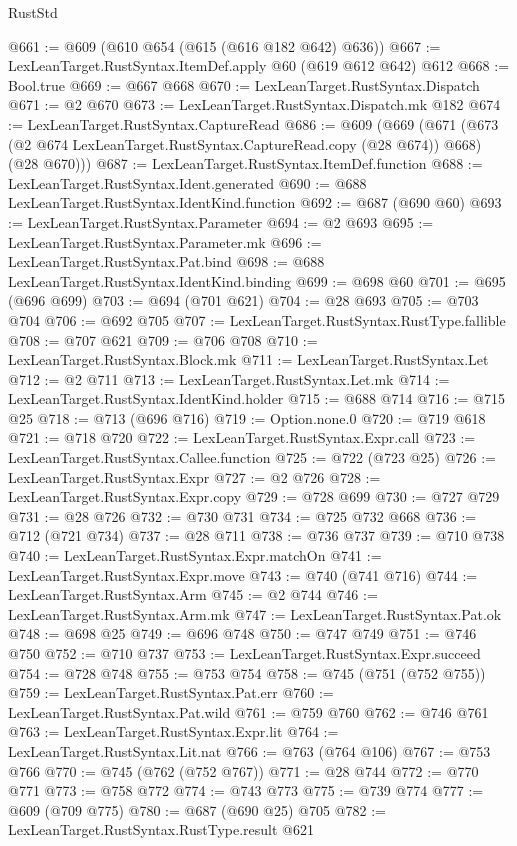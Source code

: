 \begin{lexlean}{RustStd}
\begin{coremodule}
@661 := @609 (@610 @654 (@615 (@616 @182 @642) @636))
@667 := LexLeanTarget.RustSyntax.ItemDef.apply @60 (@619 @612 @642) @612
@668 := Bool.true
@669 := @667 @668
@670 := LexLeanTarget.RustSyntax.Dispatch
@671 := @2 @670
@673 := LexLeanTarget.RustSyntax.Dispatch.mk @182
@674 := LexLeanTarget.RustSyntax.CaptureRead
@686 := @609
    (@669
      (@671 (@673 (@2 @674 LexLeanTarget.RustSyntax.CaptureRead.copy (@28 @674)) @668) (@28 @670)))
@687 := LexLeanTarget.RustSyntax.ItemDef.function
@688 := LexLeanTarget.RustSyntax.Ident.generated
@690 := @688 LexLeanTarget.RustSyntax.IdentKind.function
@692 := @687 (@690 @60)
@693 := LexLeanTarget.RustSyntax.Parameter
@694 := @2 @693
@695 := LexLeanTarget.RustSyntax.Parameter.mk
@696 := LexLeanTarget.RustSyntax.Pat.bind
@698 := @688 LexLeanTarget.RustSyntax.IdentKind.binding
@699 := @698 @60
@701 := @695 (@696 @699)
@703 := @694 (@701 @621)
@704 := @28 @693
@705 := @703 @704
@706 := @692 @705
@707 := LexLeanTarget.RustSyntax.RustType.fallible
@708 := @707 @621
@709 := @706 @708
@710 := LexLeanTarget.RustSyntax.Block.mk
@711 := LexLeanTarget.RustSyntax.Let
@712 := @2 @711
@713 := LexLeanTarget.RustSyntax.Let.mk
@714 := LexLeanTarget.RustSyntax.IdentKind.holder
@715 := @688 @714
@716 := @715 @25
@718 := @713 (@696 @716)
@719 := Option.none.{0}
@720 := @719 @618
@721 := @718 @720
@722 := LexLeanTarget.RustSyntax.Expr.call
@723 := LexLeanTarget.RustSyntax.Callee.function
@725 := @722 (@723 @25)
@726 := LexLeanTarget.RustSyntax.Expr
@727 := @2 @726
@728 := LexLeanTarget.RustSyntax.Expr.copy
@729 := @728 @699
@730 := @727 @729
@731 := @28 @726
@732 := @730 @731
@734 := @725 @732 @668
@736 := @712 (@721 @734)
@737 := @28 @711
@738 := @736 @737
@739 := @710 @738
@740 := LexLeanTarget.RustSyntax.Expr.matchOn
@741 := LexLeanTarget.RustSyntax.Expr.move
@743 := @740 (@741 @716)
@744 := LexLeanTarget.RustSyntax.Arm
@745 := @2 @744
@746 := LexLeanTarget.RustSyntax.Arm.mk
@747 := LexLeanTarget.RustSyntax.Pat.ok
@748 := @698 @25
@749 := @696 @748
@750 := @747 @749
@751 := @746 @750
@752 := @710 @737
@753 := LexLeanTarget.RustSyntax.Expr.succeed
@754 := @728 @748
@755 := @753 @754
@758 := @745 (@751 (@752 @755))
@759 := LexLeanTarget.RustSyntax.Pat.err
@760 := LexLeanTarget.RustSyntax.Pat.wild
@761 := @759 @760
@762 := @746 @761
@763 := LexLeanTarget.RustSyntax.Expr.lit
@764 := LexLeanTarget.RustSyntax.Lit.nat
@766 := @763 (@764 @106)
@767 := @753 @766
@770 := @745 (@762 (@752 @767))
@771 := @28 @744
@772 := @770 @771
@773 := @758 @772
@774 := @743 @773
@775 := @739 @774
@777 := @609 (@709 @775)
@780 := @687 (@690 @25) @705
@782 := LexLeanTarget.RustSyntax.RustType.result @621

\end{coremodule}
\end{lexlean}
